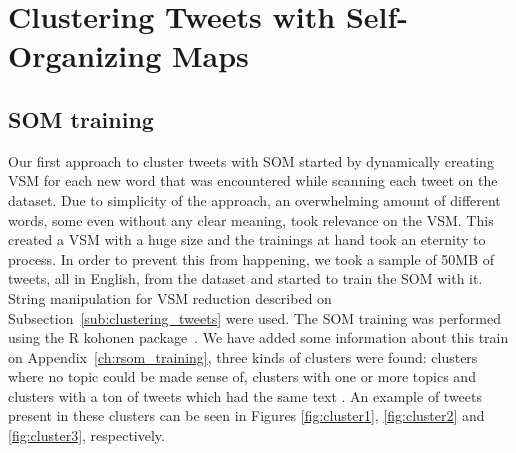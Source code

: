 \label{ch:eval_met}

\section{Clustering Tweets with Self-Organizing Maps}

\subsection{SOM training}
\label{sub:clustering_tweets_with_soms}
Our first approach to cluster tweets with \ac{SOM} started by dynamically creating \ac{VSM} for each new word that was encountered while scanning each tweet on the dataset. Due to simplicity of the approach, an overwhelming amount of different words, some even without any clear meaning, took relevance on the \ac{VSM}. 
This created a \ac{VSM} with a huge size and the trainings at hand took an eternity to process. In order to prevent this from happening, we took a sample of 50MB of tweets, all in English, from the dataset and started to train the \ac{SOM} with it. String manipulation for \ac{VSM} reduction described on Subsection~\ref{sub:clustering_tweets} were used.
The \ac{SOM} training was performed using the R kohonen package~\cite{rsom}. We have added some information about this train on Appendix~\ref{ch:rsom_training}, three kinds of clusters were found: clusters where no topic could be made sense of, clusters with one or more topics and clusters with a ton of tweets which had the same text . An example of tweets present in these clusters can be seen in Figures \ref{fig:cluster1}, \ref{fig:cluster2} and \ref{fig:cluster3}, respectively.  

